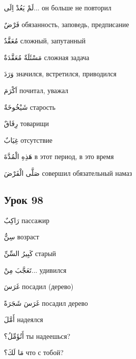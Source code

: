 \documentclass[a5paper]{article}
\newcommand\textstyleDropCaps[1]{#1}
\newcommand\textstyleCaptioncharacters[1]{#1}
\begin{document}
\textstyleCaptioncharacters{لَمْ يَعُدْ اِلَى... }\textstyleDropCaps{он больше не повторил‎}

\textstyleCaptioncharacters{فَرْضٌ }\textstyleDropCaps{обязанность, запо­ведь, предписание‎}

\textstyleCaptioncharacters{مُعَقَّدٌ }\textstyleDropCaps{сложный, запутан­ный‎}

\textstyleCaptioncharacters{مَسْئَلَةٌ مُعَقَّدَةٌ }\textstyleDropCaps{сложная задача‎}

\textstyleCaptioncharacters{وَرَدَ }\textstyleDropCaps{значился, встретился, приводился‎}

\textstyleCaptioncharacters{اَكْرَمَ }\textstyleDropCaps{почитал, уважал‎}

\textstyleCaptioncharacters{شَيْخُوخَةٌ }\textstyleDropCaps{старость‎}

\textstyleCaptioncharacters{رِفَاقٌ }\textstyleDropCaps{товарищи‎}

\textstyleCaptioncharacters{غِيَابٌ }\textstyleDropCaps{отсутствие‎}

\textstyleCaptioncharacters{هَذِهِ الْمُدَّةَ }\textstyleDropCaps{в этот пери­од, в это время‎}

\textstyleCaptioncharacters{صَلَّى الْفَرْضَ }\textstyleDropCaps{совершил обязательный намаз‎}

\subsection[Урок 98‎]{\textstyleDropCaps{Урок 98‎}}
\textstyleCaptioncharacters{رَاكِبٌ }\textstyleDropCaps{пассажир‎}

\textstyleCaptioncharacters{سِنٌّ }\textstyleDropCaps{возраст‎}

\textstyleCaptioncharacters{كَبِيرُ السِّنِّ }\textstyleDropCaps{старый‎}

\textstyleCaptioncharacters{تَعَجَّبَ مِنْ... }\textstyleDropCaps{удивился‎}

\textstyleCaptioncharacters{غَرَسَ }\textstyleDropCaps{посадил (дерево)‎}

\textstyleCaptioncharacters{غَرَسَ شَجَرَةً }\textstyleDropCaps{посадил дерево‎}

\textstyleCaptioncharacters{أَمَّلَ }\textstyleDropCaps{надеялся‎}

\textstyleCaptioncharacters{أَتُؤَمِّلُ؟ }\textstyleDropCaps{ты надеешься?‎}

\textstyleCaptioncharacters{مَا لَكَ؟ }\textstyleDropCaps{что с тобой?‎}
\end{document}
